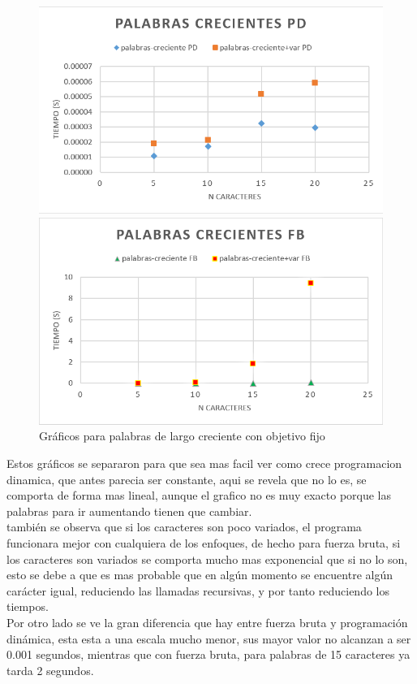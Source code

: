 \begin{figure}[H]
    \centering
    \begin{minipage}[t]{0.5\textwidth}
        \includegraphics[width=\textwidth]{images/palabras-credientes-pd.png}
    \end{minipage}%
    \begin{minipage}[t]{0.5\textwidth}
        \includegraphics[width=\textwidth]{images/palabras-credientes-fb.png}    \end{minipage}%
    \caption{Gráficos para palabras de largo creciente con objetivo fijo}
    \label{fig:Pcreciente}
\end{figure} 

Estos gráficos se separaron para que sea mas facil ver como crece programacion dinamica, que antes parecia ser constante, aqui se revela que no lo es, se comporta de forma mas lineal, aunque el grafico no es muy exacto porque las palabras para ir aumentando tienen que cambiar.\\
también se observa que si los caracteres son poco variados, el programa funcionara mejor con cualquiera de los enfoques, de hecho para fuerza bruta, si los caracteres son variados se comporta mucho mas exponencial que si no lo son, esto se debe a que es mas probable que en algún momento se encuentre algún carácter igual,  reduciendo las llamadas recursivas, y por tanto reduciendo los tiempos.\\
Por otro lado se ve la gran diferencia que hay entre fuerza bruta y programación dinámica, esta esta a una escala mucho menor, sus mayor valor no alcanzan a ser 0.001 segundos, mientras que con fuerza bruta, para palabras de 15 caracteres ya tarda 2 segundos.\\


